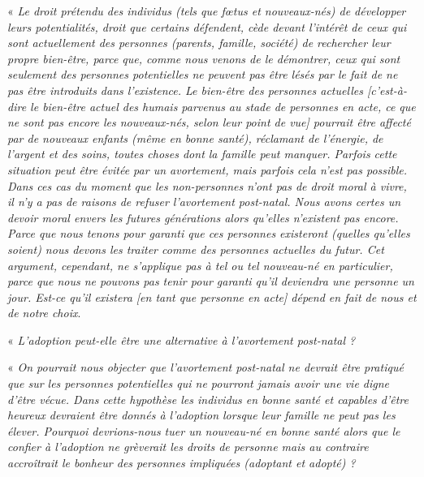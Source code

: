 « \emph{Le droit prétendu des individus (tels que fœtus et nouveaux-nés) de développer leurs potentialités, droit que certains défendent, cède devant l'intérêt de ceux qui sont actuellement des personnes (parents, famille, société) de rechercher leur propre bien-être, parce que, comme nous venons de le démontrer, ceux qui sont seulement des personnes potentielles ne peuvent pas être lésés par le fait de ne pas être introduits dans l'existence. Le bien-être des personnes actuelles \emph{[c'est-à-dire le bien-être actuel des humais parvenus au stade de personnes en acte, ce que ne sont pas encore les nouveaux-nés, selon leur point de vue]} pourrait être affecté par de nouveaux enfants (même en bonne santé), réclamant de l'énergie, de l'argent et des soins, toutes choses dont la famille peut manquer. Parfois cette situation peut être évitée par un avortement, mais parfois cela n'est pas possible. Dans ces cas du moment que les non-personnes n'ont pas de droit moral à vivre, il n'y a pas de raisons de refuser l'avortement post-natal. Nous avons certes un devoir moral envers les futures générations alors qu'elles n'existent pas encore. Parce que nous tenons pour garanti que ces personnes existeront (quelles qu'elles soient) nous devons les traiter comme des personnes actuelles du futur. Cet argument, cependant, ne s'applique pas à tel ou tel nouveau-né en particulier, parce que nous ne pouvons pas tenir pour garanti qu'il deviendra une personne un jour. Est-ce qu'il existera \emph{[en tant que personne en acte]} dépend en fait de nous et de notre choix}.

« \emph{L'adoption peut-elle être une alternative à l'avortement post-natal ?}

« \emph{On pourrait nous objecter que l'avortement post-natal ne devrait être pratiqué que sur les personnes potentielles qui ne pourront jamais avoir une vie digne d'être vécue. Dans cette hypothèse les individus en bonne santé et capables d'être heureux devraient être donnés à l'adoption lorsque leur famille ne peut pas les élever. Pourquoi devrions-nous tuer un nouveau-né en bonne santé alors que le confier à l'adoption ne grèverait les droits de personne mais au contraire accroîtrait le bonheur des personnes impliquées (adoptant et adopté) ?}

